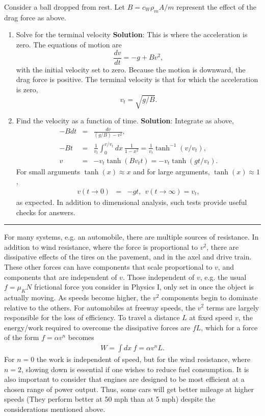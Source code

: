 \example
Consider a ball dropped from rest. Let $B=c_W\rho_mA/m$ represent the effect of the drag force as above.
\begin{enumerate}\itemsep -4pt
\item Solve for the terminal velocity
{\bf Solution}: This is where the acceleration is zero. The equations of motion are
\[
\frac{dv}{dt}=-g+Bv^2,
\]
with the initial velocity set to zero. Because the motion is downward, the drag force is positive. The terminal velocity is that for which the acceleration is zero,
\[
v_{t}=\sqrt{g/B}.
\]
\item Find the velocity as a function of time.
{\bf Solution}: Integrate as above,
\begin{eqnarray*}
-Bdt&=&\frac{dv}{(g/B)-v^2},\\
-Bt&=&\frac{1}{v_t}\int_0^{v/v_t}dx~\frac{1}{1-x^2}=\frac{1}{v_t}\tanh^{-1}(v/v_t),\\
v&=&-v_t\tanh(Bv_tt)=-v_t\tanh(gt/v_t).
\end{eqnarray*}
For small arguments $\tanh(x)\approx x$ and for large arguments, $\tanh(x)\approx 1$,
\begin{eqnarray*}
v(t\rightarrow 0)&=&-gt, ~~v(t\rightarrow\infty)=v_t,
\end{eqnarray*}
as expected. In addition to dimensional analysis, such tests provide useful checks for answers.
\end{enumerate}
\noindent\rule{\textwidth}{1pt}

For many systems, e.g. an automobile, there are multiple sources of resistance. In addition to wind resistance, where the force is proportional to $v^2$, there are dissipative effects of the tires on the pavement, and in the axel and drive train. These other forces can have components that scale proportional to $v$, and components that are independent of $v$. Those independent of $v$, e.g. the usual $f=\mu_K N$ frictional force you consider in Physics I, only set in once the object is actually moving. As speeds become higher, the $v^2$ components begin to dominate relative to the others. For automobiles at freeway speeds, the $v^2$ terms are largely responsible for the loss of efficiency. To travel a distance $L$ at fixed speed $v$, the energy/work required to overcome the dissipative forces are $fL$, which for a force of the form $f=\alpha v^n$ becomes
\begin{eqnarray}
W=\int dx~f=\alpha v^n L.
\end{eqnarray}
For $n=0$ the work is independent of speed, but for the wind resistance, where $n=2$, slowing down is essential if one wishes to reduce fuel consumption. It is also important to consider that engines are designed to be most efficient at a chosen range of power output. Thus, some cars will get better mileage at higher speeds (They perform better at 50 mph than at 5 mph) despite the considerations mentioned above.

